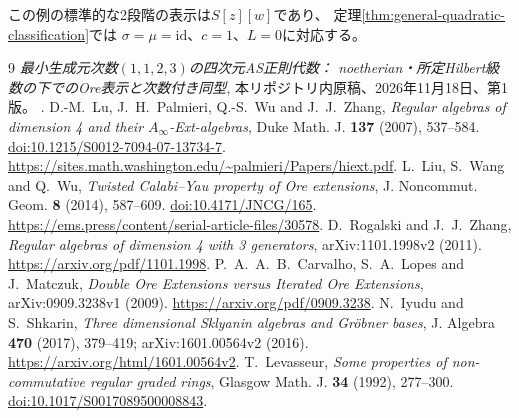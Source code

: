 \documentclass[11pt,a4paper]{ltjsarticle}
\theoremstyle{definition}
\begin{document}
この例の標準的な2段階の表示は$S[z][w]$であり、
定理\ref{thm:general-quadratic-classification}では
$\sigma=\mu=\mathrm{id}$、$c=1$、$L=0$に対応する。

\begingroup
\small
\begin{thebibliography}{9}
\emph{最小生成元次数$(1,1,2,3)$の四次元AS正則代数：
noetherian・所定Hilbert級数の下でのOre表示と次数付き同型},
本リポジトリ内原稿、2026年11月18日、第1版。
.
D.-M.~Lu, J.~H.~Palmieri, Q.-S.~Wu and J.~J.~Zhang,
\emph{Regular algebras of dimension 4 and their $A_\infty$-Ext-algebras},
Duke Math. J. \textbf{137} (2007), 537--584.
\href{https://doi.org/10.1215/S0012-7094-07-13734-7}{doi:10.1215/S0012-7094-07-13734-7}.
\url{https://sites.math.washington.edu/~palmieri/Papers/hiext.pdf}.
L.~Liu, S.~Wang and Q.~Wu,
\emph{Twisted Calabi--Yau property of Ore extensions},
J. Noncommut. Geom. \textbf{8} (2014), 587--609.
\href{https://doi.org/10.4171/JNCG/165}{doi:10.4171/JNCG/165}.
\url{https://ems.press/content/serial-article-files/30578}.
D.~Rogalski and J.~J.~Zhang,
\emph{Regular algebras of dimension 4 with 3 generators},
arXiv:1101.1998v2 (2011).
\url{https://arxiv.org/pdf/1101.1998}.
P.~A.~A.~B.~Carvalho, S.~A.~Lopes and J.~Matczuk,
\emph{Double Ore Extensions versus Iterated Ore Extensions},
arXiv:0909.3238v1 (2009).
\url{https://arxiv.org/pdf/0909.3238}.
N.~Iyudu and S.~Shkarin,
\emph{Three dimensional Sklyanin algebras and Gr\"obner bases},
J. Algebra \textbf{470} (2017), 379--419;
arXiv:1601.00564v2 (2016).
\url{https://arxiv.org/html/1601.00564v2}.
T.~Levasseur,
\emph{Some properties of non-commutative regular graded rings},
Glasgow Math. J. \textbf{34} (1992), 277--300.
\href{https://doi.org/10.1017/S0017089500008843}{doi:10.1017/S0017089500008843}.
\end{thebibliography}
\endgroup
\end{document}
